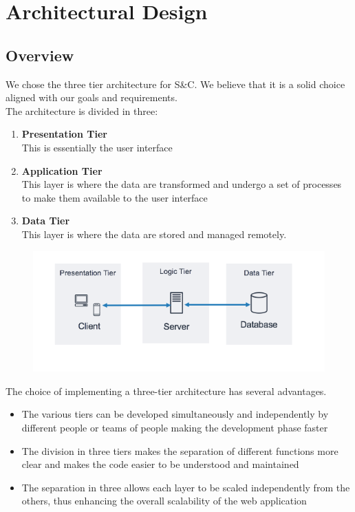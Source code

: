 \section{Architectural Design}
\subsection{Overview}
We chose the three tier architecture for S\&C. We believe that it is a solid choice aligned with our goals and requirements. \\
The architecture is divided in three:
\begin{enumerate}
    \item\textbf{Presentation Tier} \\
    This is essentially the user interface
    \item\textbf{ Application Tier} \\
    This layer is where the data are transformed and undergo a set of processes to make them available to the user interface
    \item\textbf{Data Tier} \\
    This layer is where the data are stored and managed remotely.
\end{enumerate}
\begin{figure}[h!]
        \centering  \includegraphics[width=1\textwidth]{DD/Images/aws.png}
        \label{fig:CompleteStudentProfile}
\end{figure}
The choice of implementing a three-tier architecture has several advantages.
\begin{itemize}
    \item The various tiers can be developed simultaneously and independently by different people or teams of people making the development phase faster
    \item The division in three tiers makes the separation of different functions more clear and makes the code easier to be understood and maintained
    \item The separation in three allows each layer to be scaled independently from the others, thus enhancing the overall scalability of the web application
\end{itemize}
